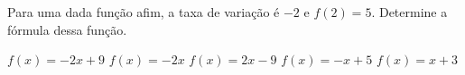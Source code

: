 Para uma dada função afim, a taxa de variação é $-2$ e $f(2)=5$. Determine a fórmula dessa função.

$f(x)=-2x+9$
$f(x)=-2x$
$f(x)=2x-9$
$f(x)=-x+5$
$f(x)=x+3$



